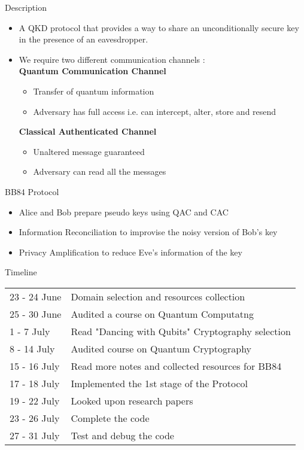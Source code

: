 \documentclass[10 pt]{beamer}
\begin{document}
\begin{frame}{Description}
    \begin{itemize}
        \item A QKD protocol that provides a way to share an unconditionally secure key in the presence of an eavesdropper.\\
        \item We require two different communication channels : \\
            \textbf{Quantum Communication Channel} \\
            \begin{itemize}
                \item Transfer of quantum information
                \item Adversary has full access i.e. can intercept, alter, store and resend
            \end{itemize}
            \textbf{Classical Authenticated Channel} \\
            \begin{itemize}
                \item Unaltered message guaranteed
                \item Adversary can read all the messages
            \end{itemize}
    \end{itemize}
\end{frame}

\begin{frame}{BB84 Protocol}
    \begin{itemize}[<+->]
        \item Alice and Bob prepare pseudo keys using QAC and CAC
        \item Information Reconciliation to improvise the noisy version of Bob's key
        \item Privacy Amplification to reduce Eve's information of the key
    \end{itemize}
\end{frame}


\begin{frame}{Timeline}
    \begin{tabular}{ll}
            23 - 24 June & Domain selection and resources collection\\
            25 - 30 June & Audited a course on Quantum Computatng\\
            1 - 7 July & Read "Dancing with Qubits" Cryptography selection\\
            8 - 14 July & Audited course on Quantum Cryptography\\
            15 - 16 July & Read more notes and collected resources for BB84\\
            17 - 18 July & Implemented the 1st stage of the Protocol\\
            19 - 22 July & Looked upon research papers\\
            23 - 26 July & Complete the code\\
            27 - 31 July & Test and debug the code\\
     \end{tabular}
\end{frame}
\end{document}
